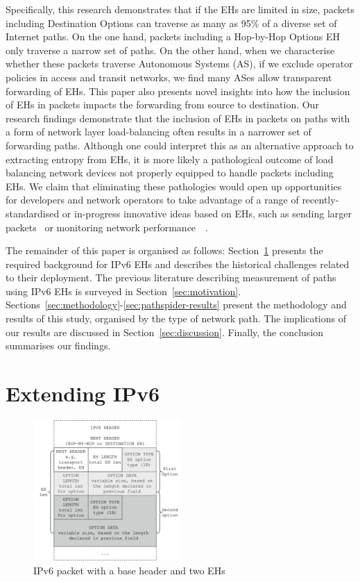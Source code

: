 \documentclass[conference]{IEEEtran}
\begin{document}
Specifically, this research demonstrates that if the EHs are limited in size,
packets including Destination Options can traverse as many as
95\% of a diverse set of Internet paths.  On the one hand, packets including a Hop-by-Hop Options EH only traverse a narrow set of paths. On the other hand, when we
characterise whether these packets traverse Autonomous Systems (AS), if we exclude operator policies in access and transit networks, we find many ASes allow transparent forwarding of EHs.
This paper also presents novel insights into how the inclusion of EHs in packets
impacts the forwarding from source to destination. Our research findings
demonstrate that the inclusion of EHs in packets on paths with a form of network layer load-balancing often results in a narrower set of forwarding paths. Although one could interpret this as an
alternative approach to extracting entropy from EHs, it is more likely a
pathological outcome of load balancing network devices not properly equipped
to handle packets including EHs.
We claim that eliminating these pathologies would open up opportunities for
developers and network operators to take advantage of a range of recently-standardised or in-progress innovative ideas based on EHs, such as sending larger packets~\cite{rfc9268} or monitoring network
performance~\cite{rfc8250}~\cite{ietf-ippm-ioam-ipv6-options-10}.


The remainder of this paper is organised as follows:  Section~\ref{sec:background} presents
the required background for IPv6 EHs and describes the historical challenges related to
their deployment.  The previous literature describing measurement of paths using IPv6
EHs is surveyed in Section~\ref{sec:motivation}.
Sections~\ref{sec:methodology}-\ref{sec:pathspider-results} present the
methodology and results of this study, organised by the type of network path.  The
implications of our results are discussed in Section~\ref{sec:discussion}.
Finally, the conclusion summarises our findings.

\section{Extending IPv6}
\label{sec:background}

\label{sec:ipv6-option-deployment}

\begin{figure}
\centering
  \includegraphics[width=0.5\textwidth]{ehformat.png}
  \caption{IPv6 packet with a base header and two EHs}
  \label{fig:eh-format}
\end{figure}
\end{document}
